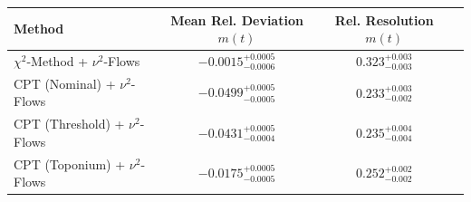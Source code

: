     \begin{tabular}{lccc}
        \toprule
        Method & Mean Rel. Deviation $m(t)$ & Rel. Resolution $m(t)$ \\
        \midrule
        $\chi^2$-Method + $\nu^2$-Flows & $-0.0015^{+0.0005}_{-0.0006}$ & $0.323^{+0.003}_{-0.003}$ \\
        CPT (Nominal) + $\nu^2$-Flows & $-0.0499^{+0.0005}_{-0.0005}$ & $0.233^{+0.003}_{-0.002}$ \\
        CPT (Threshold) + $\nu^2$-Flows & $-0.0431^{+0.0005}_{-0.0004}$ & $0.235^{+0.004}_{-0.004}$ \\
        CPT (Toponium) + $\nu^2$-Flows & $-0.0175^{+0.0005}_{-0.0005}$ & $0.252^{+0.002}_{-0.002}$ \\
        \bottomrule
    \end{tabular}